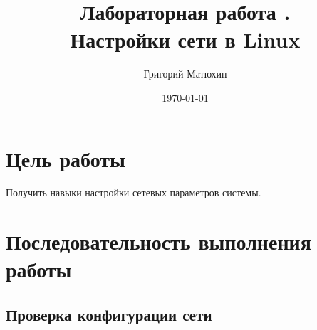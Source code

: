\documentclass[12pt]{article}
\author{Григорий Матюхин}
\date{\today}
\title{Лабораторная работа \textnumero12.\\Настройки сети в Linux}
\begin{document}
\maketitle
\newpage
\tableofcontents
\newpage
\section{Цель работы}
Получить навыки настройки сетевых параметров системы.

\section{Последовательность выполнения работы}

\subsection{Проверка конфигурации сети}
\end{document}
